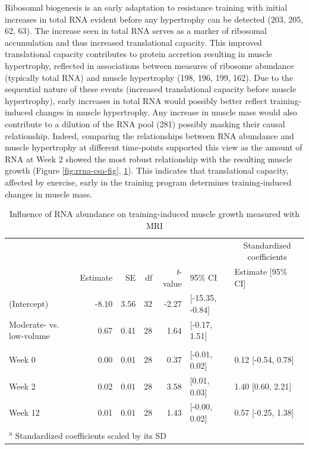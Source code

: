 \documentclass[twoside,10pt]{gihclass} %
\begin{document}
Ribosomal biogenesis is an early adaptation to resistance training with initial increases in total RNA evident before any hypertrophy can be detected
(203, 205, 62, 63).
The increase seen in total RNA serves as a marker of ribosomal accumulation and thus increased translational capacity. This improved translational capacity contributes to protein accretion resulting in muscle hypertrophy, reflected in associations between measures of ribosome abundance (typically total RNA) and muscle hypertrophy
(198, 196, 199, 162).
Due to the sequential nature of these events (increased translational capacity before muscle hypertrophy), early increases in total RNA would possibly better reflect training-induced changes in muscle hypertrophy.
Any increase in muscle mass would also contribute to a dilution of the RNA pool
(281)
possibly masking their causal relationship.
Indeed, comparing the relationships between RNA abundance and muscle hypertrophy at different time-points supported this view as the amount of RNA at Week 2 showed the most robust relationship with the resulting muscle growth (Figure \ref{fig:rrna-csa-fig}, \ref{tab:rna-csa-tab}). This indicates that translational capacity, affected by exercise, early in the training program determines training-induced changes in muscle mass.
\begin{table}

\caption{\label{tab:rna-csa-tab}Influence of RNA abundance on training-induced muscle growth measured with MRI}
\centering
\fontsize{8}{10}\selectfont
\begin{tabular}[t]{lrrrrll}
\toprule
\multicolumn{6}{c}{ } & \multicolumn{1}{c}{Standardized coefficients} \\
\cmidrule(l{3pt}r{3pt}){7-7}
 & Estimate & SE & df & \textit{t}-value & 95\% CI & Estimate [95\% CI]\\
\midrule
(Intercept) & -8.10 & 3.56 & 32 & -2.27 & [-15.35, -0.84] & \\
Moderate- vs. low-volume & 0.67 & 0.41 & 28 & 1.64 & [-0.17, 1.51] & \\
\addlinespace[0.3em]
\multicolumn{7}{l}{\textbf{RNA abundance (ng mg\textsuperscript{-1})}}\\
\hspace{1em}Week 0 & 0.00 & 0.01 & 28 & 0.37 & [-0.01, 0.02] & 0.12 [-0.54, 0.78]\\
\hspace{1em}Week 2 & 0.02 & 0.01 & 28 & 3.58 & [0.01, 0.03] & 1.40 [0.60, 2.21]\\
\hspace{1em}Week 12 & 0.01 & 0.01 & 28 & 1.43 & [-0.00, 0.02] & 0.57 [-0.25, 1.38]\\
\bottomrule
\multicolumn{7}{l}{\textsuperscript{a} Standardized coefficients scaled by its SD}\\
\end{tabular}
\end{table}
\end{document}
